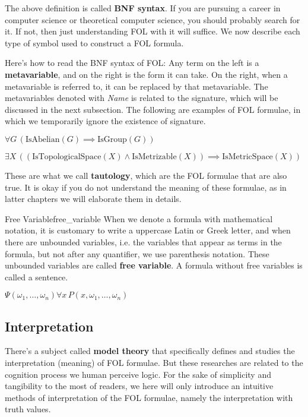 \documentclass[../main.tex]{subfiles}
\begin{document}
The above definition is called \textbf{BNF syntax}. If you are pursuing a career in computer science or theoretical computer science, you should probably search for it. If not, then just understanding FOL with it will suffice. We now describe each type of symbol used to construct a FOL formula.

Here's how to read the BNF syntax of FOL: Any term on the left is a \textbf{metavariable}, and on the right is the form it can take. On the right, when a metavariable is referred to, it can be replaced by that metavariable. The metavariables denoted with \textit{Name} is related to the signature, which will be discussed in the next subsection. The following are examples of FOL formulae, in which we temporarily ignore the existence of signature.

\begin{example}
$\forall G\,(\text{IsAbelian}(G)\implies\text{IsGroup}(G))$
\end{example}
\begin{example}
$\exists X\,((\text{IsTopologicalSpace}(X)\land\text{IsMetrizable}(X))\implies\text{IsMetricSpace}(X))$
\end{example}

These are what we call \textbf{tautology}, which are the FOL formulae that are also true. It is okay if you do not understand the meaning of these formulae, as in latter chapters we will elaborate them in details.

\begin{definition}{Free Variable}{free_variable}
When we denote a formula with mathematical notation, it is customary to write a uppercase Latin or Greek letter, and when there are unbounded variables, i.e. the variables that appear as terms in the formula, but not after any quantifier, we use parenthesis notation. These unbounded variables are called \textbf{free variable}. A formula without free variables is called a sentence.
\end{definition}
\begin{example}
$\Psi(\omega_1,\dots,\omega_n)\forall x\,P(x,\omega_1,\dots,\omega_n)$
\end{example}

\subsection{Interpretation}
There's a subject called \textbf{model theory} that specifically defines and studies the interpretation (meaning) of FOL formulae. But these researches are related to the cognition process we human perceive logic. For the sake of simplicity and tangibility to the most of readers, we here will only introduce an intuitive methods of interpretation of the FOL formulae, namely the interpretation with truth values.
\end{document}
